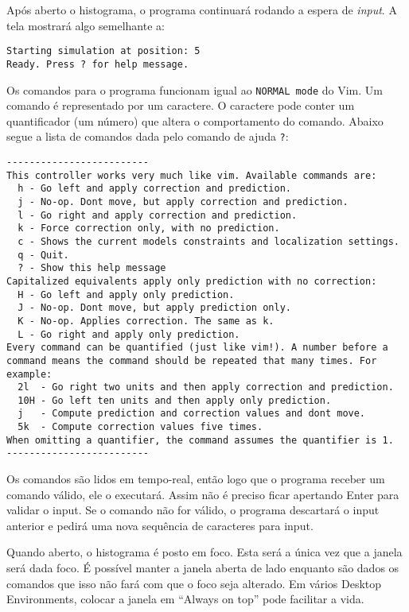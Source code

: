 \documentclass[12pt]{article}
\theoremstyle{plain}
\numberwithin{equation}{section}
\newcommand{\code}[1]{\lstinline[mathescape=true]{#1}}
\begin{document}
Após aberto o histograma, o programa continuará rodando a espera de \textit{input}. A tela mostrará
algo semelhante a:\\

\begin{lstlisting}
Starting simulation at position: 5
Ready. Press ? for help message.
\end{lstlisting}

Os comandos para o programa funcionam igual ao \texttt{NORMAL mode} do Vim. Um comando é
representado por um caractere. O caractere pode conter um quantificador (um número) que altera o
comportamento do comando. Abaixo segue a lista de comandos dada pelo comando de ajuda \code{?}:\\

\begin{lstlisting}
-------------------------
This controller works very much like vim. Available commands are:
  h - Go left and apply correction and prediction.
  j - No-op. Dont move, but apply correction and prediction.
  l - Go right and apply correction and prediction.
  k - Force correction only, with no prediction.
  c - Shows the current models constraints and localization settings.
  q - Quit.
  ? - Show this help message
Capitalized equivalents apply only prediction with no correction:
  H - Go left and apply only prediction.
  J - No-op. Dont move, but apply prediction only.
  K - No-op. Applies correction. The same as k.
  L - Go right and apply only prediction.
Every command can be quantified (just like vim!). A number before a command means the command should be repeated that many times. For example:
  2l  - Go right two units and then apply correction and prediction.
  10H - Go left ten units and then apply only prediction.
  j   - Compute prediction and correction values and dont move.
  5k  - Compute correction values five times.
When omitting a quantifier, the command assumes the quantifier is 1.
-------------------------
\end{lstlisting}

Os comandos são lidos em tempo-real, então logo que o programa receber um comando válido, ele o
executará. Assim não é preciso ficar apertando Enter para validar o input. Se o comando não for
válido, o programa descartará o input anterior e pedirá uma nova sequência de caracteres para
input.

Quando aberto, o histograma é posto em foco. Esta será a única vez que a janela será dada
foco. É possível manter a janela aberta de lado enquanto são dados os comandos que isso não fará
com que o foco seja alterado. Em vários Desktop Environments, colocar a janela em ``Always on top''
pode facilitar a vida.
\end{document}
